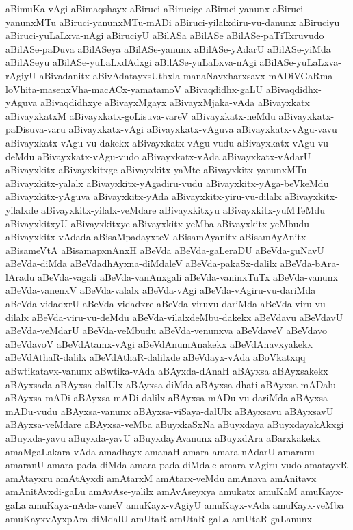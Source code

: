 {aBimuKa-vAgi
aBimaqshayx
aBiruci
aBirucige
aBiruci-yanunx
aBiruci-yanunxMTu
aBiruci-yanunxMTu-mADi
aBiruci-yilalxdiru-vu-danunx
aBiruciyu
aBiruci-yuLaLxva-nAgi
aBiruciyU
aBilASa
aBilASe
aBilASe-paTiTxruvudo
aBilASe-paDuva
aBilASeya
aBilASe-yanunx
aBilASe-yAdarU
aBilASe-yiMda
aBilASeyu
aBilASe-yuLaLxdAdxgi
aBilASe-yuLaLxva-nAgi
aBilASe-yuLaLxva-rAgiyU
aBivadanitx
aBivAdatayxsUthxla-manaNavxharxsavx-mADiVGaRma-loVhita-masenxVha-macACx-yamatamoV
aBivaqdidhx-gaLU
aBivaqdidhx-yAguva
aBivaqdidhxye
aBivayxMgayx
aBivayxMjaka-vAda
aBivayxkatx
aBivayxkatxM
aBivayxkatx-goLisuva-vareV
aBivayxkatx-neMdu
aBivayxkatx-paDisuva-varu
aBivayxkatx-vAgi
aBivayxkatx-vAguva
aBivayxkatx-vAgu-vavu
aBivayxkatx-vAgu-vu-dakekx
aBivayxkatx-vAgu-vudu
aBivayxkatx-vAgu-vu-deMdu
aBivayxkatx-vAgu-vudo
aBivayxkatx-vAda
aBivayxkatx-vAdarU
aBivayxkitx
aBivayxkitxge
aBivayxkitx-yaMte
aBivayxkitx-yanunxMTu
aBivayxkitx-yalalx
aBivayxkitx-yAgadiru-vudu
aBivayxkitx-yAga-beVkeMdu
aBivayxkitx-yAguva
aBivayxkitx-yAda
aBivayxkitx-yiru-vu-dilalx
aBivayxkitx-yilalxde
aBivayxkitx-yilalx-veMdare
aBivayxkitxyu
aBivayxkitx-yuMTeMdu
aBivayxkitxyU
aBivayxkitxye
aBivayxkitx-yeMba
aBivayxkitx-yeMbudu
aBivayxkitx-vAdada
aBisaMpadayxteV
aBisamAyanitx
aBisamAyAnitx
aBisameVtA
aBisamapxnAnxH
aBeVda
aBeVda-gaLeraDU
aBeVda-guNavU
aBeVda-diMda
aBeVdadhAyxna-diMdaleV
aBeVda-pakaSx-dalilx
aBeVda-bAra-lAradu
aBeVda-vagali
aBeVda-vanAnxgali
aBeVda-vaninxTuTx
aBeVda-vanunx
aBeVda-vanenxV
aBeVda-valalx
aBeVda-vAgi
aBeVda-vAgiru-vu-dariMda
aBeVda-vidadxrU
aBeVda-vidadxre
aBeVda-viruvu-dariMda
aBeVda-viru-vu-dilalx
aBeVda-viru-vu-deMdu
aBeVda-vilalxdeMbu-dakekx
aBeVdavu
aBeVdavU
aBeVda-veMdarU
aBeVda-veMbudu
aBeVda-venunxva
aBeVdaveV
aBeVdavo
aBeVdavoV
aBeVdAtamx-vAgi
aBeVdAnumAnakekx
aBeVdAnavxyakekx
aBeVdAthaR-dalilx
aBeVdAthaR-dalilxde
aBeVdayx-vAda
aBoVkatxqq
aBwtikatavx-vanunx
aBwtika-vAda
aBAyxda-dAnaH
aBAyxsa
aBAyxsakekx
aBAyxsada
aBAyxsa-dalUlx
aBAyxsa-diMda
aBAyxsa-dhati
aBAyxsa-mADalu
aBAyxsa-mADi
aBAyxsa-mADi-dalilx
aBAyxsa-mADu-vu-dariMda
aBAyxsa-mADu-vudu
aBAyxsa-vanunx
aBAyxsa-viSaya-dalUlx
aBAyxsavu
aBAyxsavU
aBAyxsa-veMdare
aBAyxsa-veMba
aBuyxkaSxNa
aBuyxdaya
aBuyxdayakAkxgi
aBuyxda-yavu
aBuyxda-yavU
aBuyxdayAvanunx
aBuyxdAra
aBarxkakekx
amaMgaLakara-vAda
amadhayx
amanaH
amara
amara-nAdarU
amaranu
amaranU
amara-pada-diMda
amara-pada-diMdale
amara-vAgiru-vudo
amatayxR
amAtayxru
amAtAyxdi
amAtarxM
amAtarx-veMdu
amAnava
amAnitavx
amAnitAvxdi-gaLu
amAvAse-yalilx
amAvAseyxya
amukatx
amuKaM
amuKayx-gaLa
amuKayx-nAda-vaneV
amuKayx-vAgiyU
amuKayx-vAda
amuKayx-veMba
amuKayxvAyxpAra-diMdalU
amUtaR
amUtaR-gaLa
amUtaR-gaLanunx
}
